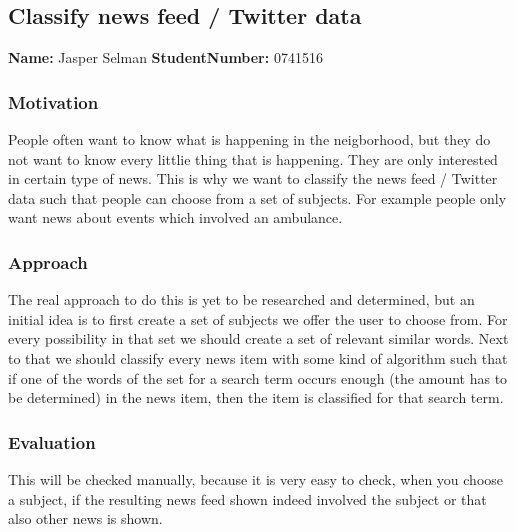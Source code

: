 \subsection{Classify news feed / Twitter data}
\textbf{Name:} Jasper Selman \indent \textbf{StudentNumber:} 0741516

\subsubsection*{Motivation}
People often want to know what is happening in the neigborhood, but they do not want to know every littlie thing that is happening.
They are only interested in certain type of news. This is why we want to classify the news feed / Twitter data such that people can choose from a set of subjects. For example people only want news about events which involved an ambulance. 

\subsubsection*{Approach}
The real approach to do this is yet to be researched and determined, but an initial idea is to first create a set of subjects we offer the user to choose from. For every possibility in that set we should create a set of relevant similar words. Next to that we should classify every news item with some kind of algorithm such that if one of the words of the set for a search term occurs enough (the amount has to be determined) in the news item, then the item is classified for that search term.

\subsubsection*{Evaluation }
This will be checked manually, because it is very easy to check, when you choose a subject, if the resulting news feed shown indeed involved the subject or that also other news is shown.